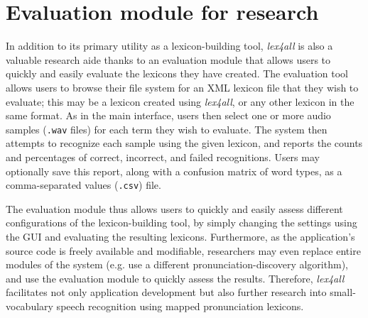 \documentclass[11pt]{article}
\begin{document}



\section{Evaluation module for research}
\label{sec:evaluation}

In addition to its primary utility as a lexicon-building tool, \textit{lex4all} is also a valuable research aide thanks to an evaluation module that allows users to quickly and easily evaluate the lexicons they have created. The evaluation tool allows users to browse their file system for an XML lexicon file that they wish to evaluate; this may be a lexicon created using \textit{lex4all}, or any other lexicon in the same format. 
As in the main interface, users then select one or more audio samples (\texttt{.wav} files) for each term they wish to evaluate.
The system then attempts to recognize each sample using the given lexicon, and reports the counts and percentages
of correct, incorrect, and failed recognitions.
Users may optionally save this report, along with a confusion matrix of word types, as a comma-separated values (\texttt{.csv}) file.

The evaluation module thus allows users to quickly and easily assess different configurations of the lexicon-building tool, by simply changing the settings using the GUI 
and evaluating the resulting lexicons. Furthermore, as the application's source code is freely available and modifiable, researchers may even replace entire modules of the system 
(e.g. use a different 
pronunciation-discovery algorithm), and use the evaluation module to quickly assess the results. 
Therefore, \textit{lex4all} facilitates not only application development but also further research into small-vocabulary speech recognition using mapped pronunciation lexicons.
\end{document}
